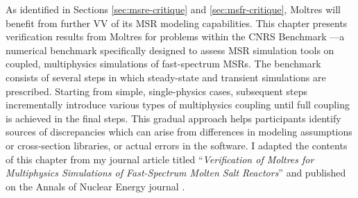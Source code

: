As identified in Sections \ref{sec:msre-critique} and \ref{sec:msfr-critique},
Moltres will benefit from further \gls{VV} of its
\gls{MSR} modeling capabilities. This chapter presents verification
results from Moltres for problems within the CNRS Benchmark
\cite{tiberga_results_2020}---a numerical benchmark specifically designed to
assess \gls{MSR} simulation tools on coupled, multiphysics simulations of
fast-spectrum \glspl{MSR}. The benchmark consists of several steps in which
steady-state and transient simulations are prescribed. Starting from simple,
single-physics cases, subsequent steps incrementally introduce various types of
multiphysics coupling until full coupling is achieved in the final steps. This
gradual approach helps participants identify sources of discrepancies
which can arise from differences in modeling assumptions or
cross-section libraries, or actual errors in the software. I adapted the
contents of this chapter from my journal article titled
``\textit{Verification of Moltres for Multiphysics Simulations of Fast-Spectrum
Molten Salt Reactors}'' and published on the Annals of Nuclear Energy journal
\cite{park_verification_2022}.





